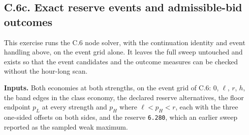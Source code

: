 \subsection{C.6c. Exact reserve events and admissible-bid
outcomes}\label{oa-c-reserve-events}

This exercise runs the C.6 node solver, with the continuation identity
and event handling above, on the event grid alone. It leaves the full
sweep untouched and exists so that the event candidates and the outcome
measures can be checked without the hour-long scan.

\textbf{Inputs.} Both economies at both strengths, on the event grid of
C.6: \(0\), \(\ell\), \(r\), \(h\), the band edges in the class economy,
the declared reserve alternatives, the floor endpoint \(p_L\) at every
strength and \(p_H\) where \(\ell<p_H<r\), each with the three one-sided
offsets on both sides, and the reserve \texttt{6.280}, which an earlier
sweep reported as the sampled weak maximum.

